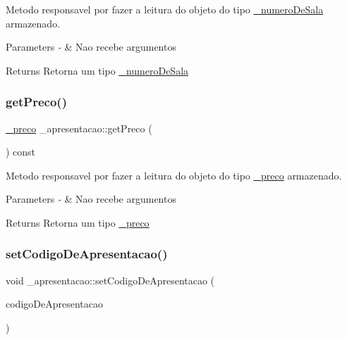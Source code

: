 Metodo responsavel por fazer a leitura do objeto do tipo \mbox{\hyperlink{class__numero_de_sala}{\+\_\+numero\+De\+Sala}} armazenado. 


\begin{DoxyParams}{Parameters}
{\em -\/} & Nao recebe argumentos \\
\hline
\end{DoxyParams}
\begin{DoxyReturn}{Returns}
Retorna um tipo \mbox{\hyperlink{class__numero_de_sala}{\+\_\+numero\+De\+Sala}} 
\end{DoxyReturn}
\mbox{\label{class__apresentacao_acb5398a12d2ec7cc11ebc1213a689079}} 
\subsubsection{\texorpdfstring{getPreco()}{getPreco()}}
{\footnotesize\ttfamily \mbox{\hyperlink{class__preco}{\+\_\+preco}} \+\_\+apresentacao\+::get\+Preco (\begin{DoxyParamCaption}{ }\end{DoxyParamCaption}) const}



Metodo responsavel por fazer a leitura do objeto do tipo \mbox{\hyperlink{class__preco}{\+\_\+preco}} armazenado. 


\begin{DoxyParams}{Parameters}
{\em -\/} & Nao recebe argumentos \\
\hline
\end{DoxyParams}
\begin{DoxyReturn}{Returns}
Retorna um tipo \mbox{\hyperlink{class__preco}{\+\_\+preco}} 
\end{DoxyReturn}
\mbox{\label{class__apresentacao_a599cb4f73b71a6da51413295aa7fa2ee}} 
\subsubsection{\texorpdfstring{setCodigoDeApresentacao()}{setCodigoDeApresentacao()}}
{\footnotesize\ttfamily void \+\_\+apresentacao\+::set\+Codigo\+De\+Apresentacao (\begin{DoxyParamCaption}\item[{const \mbox{\hyperlink{class__codigo_de_apresentacao}{\+\_\+codigo\+De\+Apresentacao}} \&}]{codigo\+De\+Apresentacao }\end{DoxyParamCaption})}



